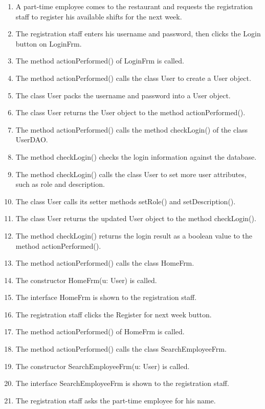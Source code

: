 \begin{enumerate}
    \item A part-time employee comes to the restaurant and requests the registration staff to register his available shifts for the next week.
    \item The registration staff enters his username and password, then clicks the Login button on LoginFrm.
    \item The method actionPerformed() of LoginFrm is called.
    \item The method actionPerformed() calls the class User to create a User object.
    \item The class User packs the username and password into a User object.
    \item The class User returns the User object to the method actionPerformed().
    \item The method actionPerformed() calls the method checkLogin() of the class UserDAO.
    \item The method checkLogin() checks the login information against the database.
    \item The method checkLogin() calls the class User to set more user attributes, such as role and description.
    \item The class User calls its setter methods setRole() and setDescription().
    \item The class User returns the updated User object to the method checkLogin().
    \item The method checkLogin() returns the login result as a boolean value to the method actionPerformed().
    \item The method actionPerformed() calls the class HomeFrm.
    \item The constructor HomeFrm(u: User) is called.
    \item The interface HomeFrm is shown to the registration staff.
    \item The registration staff clicks the Register for next week button.
    \item The method actionPerformed() of HomeFrm is called.
    \item The method actionPerformed() calls the class SearchEmployeeFrm.
    \item The constructor SearchEmployeeFrm(u: User) is called.
    \item The interface SearchEmployeeFrm is shown to the registration staff.
    \item The registration staff asks the part-time employee for his name.

\end{enumerate}
